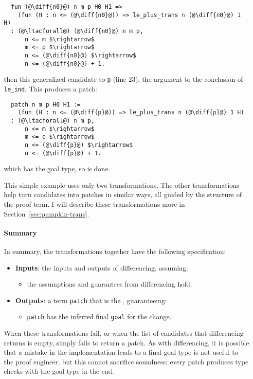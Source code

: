 \begin{lstlisting}
  fun (@\diff{n0}@) n m p H0 H1 =>
    (fun (H : n <= (@\diff{n0}@)) => le_plus_trans n (@\diff{n0}@) 1 H)
  : (@\ltacforall@) (@\diff{n0}@) n m p,
      n <= m $\rightarrow$
      m <= p $\rightarrow$
      n <= (@\diff{n0}@) $\rightarrow$
      n <= (@\diff{n0}@) + 1.
\end{lstlisting}
\sysname then  this generalized candidate to \lstinline{p} (line 23), the argument
to the conclusion of \lstinline{le_ind}. This produces a patch:

\begin{lstlisting}
  patch n m p H0 H1 :=
    (fun (H : n <= (@\diff{p}@)) => le_plus_trans n (@\diff{p}@) 1 H)
  : (@\ltacforall@) n m p,
      n <= m $\rightarrow$
      m <= p $\rightarrow$
      n <= (@\diff{p}@) $\rightarrow$
      n <= (@\diff{p}@) + 1.
\end{lstlisting}
which has the goal type, so \sysname is done.

This simple example uses only two transformations.
The other transformations help turn candidates into patches in similar ways, all guided by
the structure of the proof term.
I will describe these transformations more in Section~\ref{sec:pumpkin-trans}.

\paragraph{Summary}
In summary, the transformations together have the following specification:

\begin{itemize}
\item \textbf{Inputs}: the inputs and outputs of differencing, assuming:
\begin{itemize}
\item the assumptions and guarantees from differencing hold.
\end{itemize}
\item \textbf{Outputs}: a term \lstinline{patch} that is the , guaranteeing:
\begin{itemize}
\item \lstinline{patch} has the inferred final  \lstinline{goal} for the change.
\end{itemize}
\end{itemize}
When these transformations fail, or when the list of candidates that differencing returns is empty,
\sysname simply fails to return a patch.
As with differencing, it is possible that a mistake in the implementation
leads to a final goal type is not useful to the proof engineer,
but this cannot sacrifice soundness:
every patch \sysname produces type checks with the goal type in the end.

